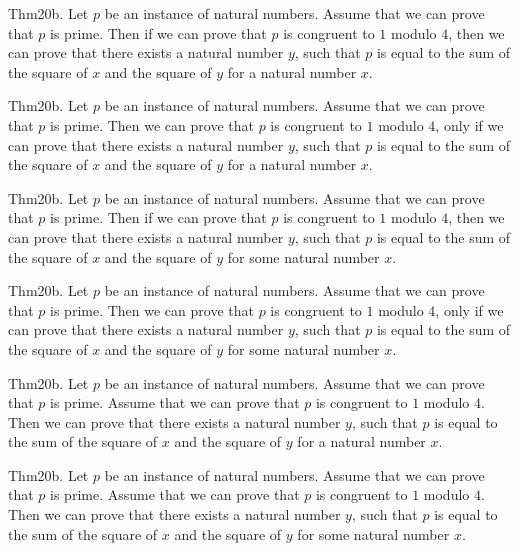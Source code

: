 \documentclass{article}
\begin{document}
Thm20b. Let $p$ be an instance of natural numbers. Assume that we can prove that $p$ is prime. Then if we can prove that $p$ is congruent to $1$ modulo $4$, then we can prove that there exists a natural number $y$, such that $p$ is equal to the sum of the square of $x$ and the square of $y$ for a natural number $x$.

Thm20b. Let $p$ be an instance of natural numbers. Assume that we can prove that $p$ is prime. Then we can prove that $p$ is congruent to $1$ modulo $4$, only if we can prove that there exists a natural number $y$, such that $p$ is equal to the sum of the square of $x$ and the square of $y$ for a natural number $x$.

Thm20b. Let $p$ be an instance of natural numbers. Assume that we can prove that $p$ is prime. Then if we can prove that $p$ is congruent to $1$ modulo $4$, then we can prove that there exists a natural number $y$, such that $p$ is equal to the sum of the square of $x$ and the square of $y$ for some natural number $x$.

Thm20b. Let $p$ be an instance of natural numbers. Assume that we can prove that $p$ is prime. Then we can prove that $p$ is congruent to $1$ modulo $4$, only if we can prove that there exists a natural number $y$, such that $p$ is equal to the sum of the square of $x$ and the square of $y$ for some natural number $x$.

Thm20b. Let $p$ be an instance of natural numbers. Assume that we can prove that $p$ is prime. Assume that we can prove that $p$ is congruent to $1$ modulo $4$. Then we can prove that there exists a natural number $y$, such that $p$ is equal to the sum of the square of $x$ and the square of $y$ for a natural number $x$.

Thm20b. Let $p$ be an instance of natural numbers. Assume that we can prove that $p$ is prime. Assume that we can prove that $p$ is congruent to $1$ modulo $4$. Then we can prove that there exists a natural number $y$, such that $p$ is equal to the sum of the square of $x$ and the square of $y$ for some natural number $x$.
\end{document}
